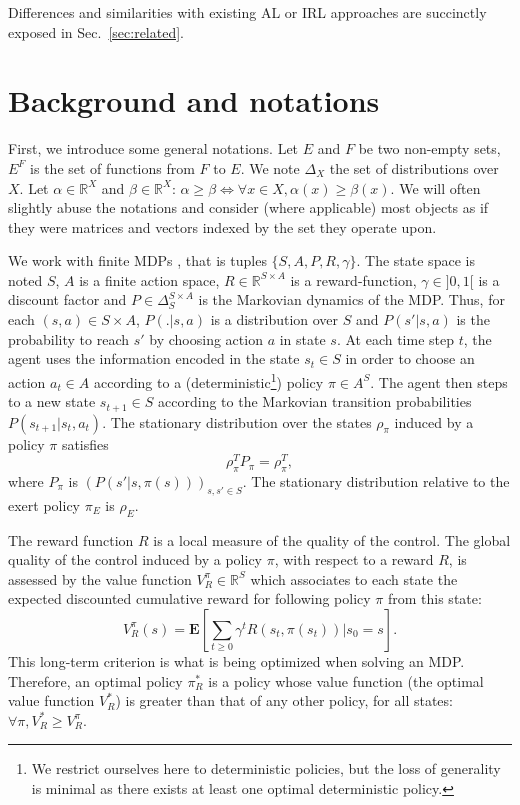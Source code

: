 \documentclass[smallextended]{svjour3}
\newcommand{\E}{\mathbf{E}}
\begin{document}
Differences and similarities with existing AL or IRL approaches are succinctly exposed in Sec.~\ref{sec:related}.
\section{Background and notations}
\label{sec:background}
First, we introduce some general notations.
Let $E$ and $F$ be two non-empty sets, $E^F$ is the set of functions from $F$ to $E$.
We note $\Delta_X$ the set of distributions over $X$.
Let $\alpha\in\mathbb{R}^X$ and $\beta\in\mathbb{R}^X$: $\alpha\geq\beta \Leftrightarrow \forall x\in X, \alpha(x) \geq \beta(x)$. We will often slightly abuse the notations and consider (where applicable) most objects as if they were matrices and vectors indexed by the set they operate upon.

We work with finite MDPs \cite{puterman1994markov}, that is tuples $\{S,A,P,R,\gamma\}$. The state space is noted $S$, $A$ is a finite action space, $R\in\mathbb{R}^{S\times A}$ is a reward-function, $\gamma\in ]0,1[$ is a discount factor and $P\in \Delta_{S}^{S\times A}$ is the Markovian dynamics of the MDP. Thus, for each $(s,a)\in S\times A$, $P(.|s,a)$ is a distribution over $S$ and $P(s'|s,a)$ is the probability to reach $s'$ by choosing action $a$ in state $s$. At each time step $t$, the agent uses the information encoded in the state $s_t\in S$ in order to choose an action $a_t \in A$ according to a (deterministic\footnote{We restrict ourselves here to deterministic policies, but the loss of generality is minimal as there exists at least one optimal deterministic policy.}) policy $\pi\in A^S$. The agent then steps to a new state $s_{t+1}\in S$ according to the Markovian transition probabilities $P(s_{t+1}|s_t,a_t)$. The stationary distribution over the states $\rho_\pi$ induced by a policy $\pi$ satisfies
\begin{equation}
  \rho_\pi^TP_\pi = \rho_\pi^T,
  \end{equation}
where $P_\pi$ is $(P(s'|s,\pi(s)))_{s,s' \in S}$. The stationary distribution relative to the exert policy $\pi_E$ is $\rho_E$.

The reward function $R$ is a local measure of the quality of the control. The global quality of the control induced by a policy $\pi$, with respect to a reward $R$, is assessed by the value function $V^\pi_R \in \mathbb{R}^{S}$ which associates to each state the expected discounted cumulative reward for following policy $\pi$ from this state:
\begin{equation}
V^\pi_R(s) = \E[\sum_{t\geq 0}\gamma^tR(s_t,\pi(s_t))|s_0 = s].
\end{equation}
This long-term criterion is what is being optimized when solving an MDP. Therefore, an optimal policy $\pi^*_R$ is a policy whose value function (the optimal value function $V^*_R$) is greater than that of any other policy, for all states: $\forall \pi, V^*_R\geq V^\pi_R$.
\end{document}
